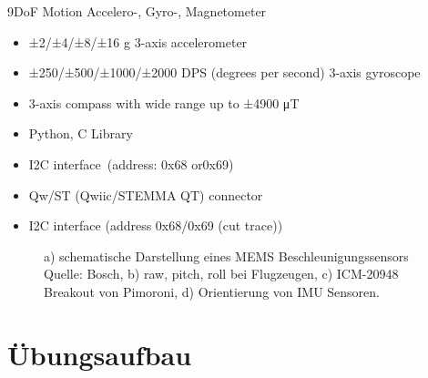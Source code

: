 \documentclass[
  11pt,
  a4paper,
  oneside, openany  ,captions=tableheading
]{scrbook}
\providecommand{\tightlist}{%
  \setlength{\itemsep}{0pt}\setlength{\parskip}{0pt}}
\theoremstyle{remark}
\renewcommand{\markright}[1]{\def\chaptertitle{#1}} %
\begin{document}
9DoF Motion Accelero-, Gyro-, Magnetometer

\begin{itemize}
\tightlist
\item
  ±2/±4/±8/±16 g 3-axis accelerometer
\item
  ±250/±500/±1000/±2000 DPS (degrees per second) 3-axis gyroscope
\item
  3-axis compass with wide range up to ±4900 μT
\item
  Python, C Library
\item
  I2C interface~(address: 0x68 or0x69)
\item
  Qw/ST (Qwiic/STEMMA QT) connector
\item
  I2C interface (address 0x68/0x69 (cut trace))
\end{itemize}

\begin{figure}


\caption{\label{fig-icm20948}a) schematische Darstellung eines MEMS
Beschleunigungssensors Quelle: Bosch, b) raw, pitch, roll bei
Flugzeugen, c) ICM-20948 Breakout von Pimoroni, d) Orientierung von IMU
Sensoren.}

\end{figure}%

\section*{Übungsaufbau}\label{uxfcbungsaufbau-2}

\markright{Übungsaufbau}
\end{document}
